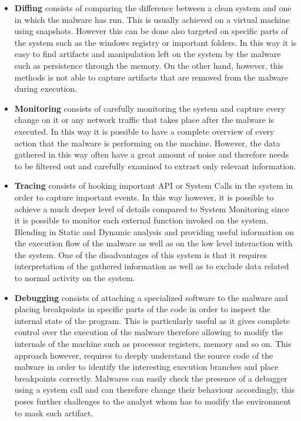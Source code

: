 \begin{itemize}
    \item \textbf{Diffing} consists of comparing the difference between a clean system and one in which the malware has run. This is usually achieved on a virtual machine using snapshots. However this can be done also targeted on specific parts of the system such as the windows registry or important folders. In this way it is easy to find artifacts and manipulation left on the system by the malware such as persistence through the memory. On the other hand, however, this methods is not able to capture artifacts that are removed from the malware during execution.  
    
    \item \textbf{Monitoring} consists of carefully monitoring the system and capture every change on it or any network traffic that takes place after the malware is executed. In this way it is possible to have a complete overview of every action that the malware is performing on the machine. However, the data gathered in this way often have a great amount of noise and therefore needs to be filtered out and carefully examined to extract only relevant information.
    
    \item \textbf{Tracing} consists of hooking important API or System Calls in the system in order to capture important events. In this way however, it is possible to achieve a much deeper level of details compared to System Monitoring since it is possible to monitor each external function invoked on the system. Blending in Static and Dynamic analysis and providing useful information on the execution flow of the malware as well as on the low level interaction with the system. One of the disadvantages of this system is that it requires interpretation of the gathered information as well as to exclude data related to normal activity on the system.
    
    \item \textbf{Debugging} consists of attaching a specialized software to the malware and placing breakpoints in specific parts of the code in order to inspect the internal state of the program. This is particularly useful as it gives complete control over the execution of the malware therefore allowing to modify the internals of the machine such as processor registers, memory and so on. This approach however, requires to deeply understand the source code of the malware in order to identify the interesting execution branches and place breakpoints correctly. Malwares can easily check the presence of a debugger using a system call and can therefore change their behaviour accordingly, this poses further challenges to the analyst whom has to modify the environment to mask such artifact. 
    
\end{itemize}

